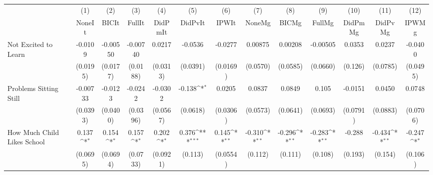 {
\def\sym#1{\ifmmode^{#1}\else\(^{#1}\)\fi}
\begin{tabular}{l*{12}{c}}
\toprule
            &\multicolumn{1}{c}{(1)}&\multicolumn{1}{c}{(2)}&\multicolumn{1}{c}{(3)}&\multicolumn{1}{c}{(4)}&\multicolumn{1}{c}{(5)}&\multicolumn{1}{c}{(6)}&\multicolumn{1}{c}{(7)}&\multicolumn{1}{c}{(8)}&\multicolumn{1}{c}{(9)}&\multicolumn{1}{c}{(10)}&\multicolumn{1}{c}{(11)}&\multicolumn{1}{c}{(12)}\\
            &\multicolumn{1}{c}{NoneIt}&\multicolumn{1}{c}{BICIt}&\multicolumn{1}{c}{FullIt}&\multicolumn{1}{c}{DidPmIt}&\multicolumn{1}{c}{DidPvIt}&\multicolumn{1}{c}{IPWIt}&\multicolumn{1}{c}{NoneMg}&\multicolumn{1}{c}{BICMg}&\multicolumn{1}{c}{FullMg}&\multicolumn{1}{c}{DidPmMg}&\multicolumn{1}{c}{DidPvMg}&\multicolumn{1}{c}{IPWMg}\\
\midrule
Not Excited to Learn&     -0.0109         &    -0.00550         &    -0.00740         &      0.0217         &     -0.0536         &     -0.0277         &     0.00875         &     0.00208         &    -0.00505         &      0.0353         &      0.0237         &     -0.0400         \\
            &    (0.0195)         &    (0.0177)         &    (0.0188)         &    (0.0313)         &    (0.0391)         &    (0.0169)         &    (0.0570)         &    (0.0585)         &    (0.0660)         &     (0.126)         &    (0.0785)         &    (0.0495)         \\
\addlinespace
Problems Sitting Still&    -0.00733         &     -0.0123         &     -0.0242         &     -0.0302         &      -0.138\sym{*}  &      0.0205         &      0.0837         &      0.0849         &       0.105         &     -0.0151         &      0.0450         &      0.0748         \\
            &    (0.0393)         &    (0.0400)         &    (0.0396)         &    (0.0567)         &    (0.0618)         &    (0.0306)         &    (0.0573)         &    (0.0641)         &    (0.0693)         &    (0.0791)         &    (0.0883)         &    (0.0706)         \\
\addlinespace
How Much Child Likes School&       0.137\sym{*}  &       0.154\sym{*}  &       0.157\sym{*}  &       0.202\sym{*}  &       0.376\sym{***}&       0.145\sym{**} &      -0.310\sym{**} &      -0.296\sym{**} &      -0.283\sym{**} &      -0.288         &      -0.434\sym{**} &      -0.247\sym{*}  \\
            &    (0.0695)         &    (0.0694)         &    (0.0733)         &    (0.0921)         &     (0.113)         &    (0.0554)         &     (0.112)         &     (0.111)         &     (0.108)         &     (0.193)         &     (0.154)         &     (0.106)         \\

\end{tabular}}
